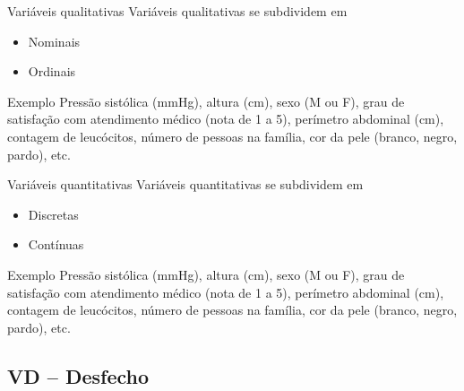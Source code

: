 \documentclass{beamer}
\begin{document}
\begin{frame}{Variáveis qualitativas}
Variáveis qualitativas se subdividem em
  \begin{itemize}
  \item<1-2> Nominais

  \item<3-4> Ordinais
  \end{itemize}


  \begin{exampleblock}{Exemplo}
    Pressão sistólica (mmHg), altura (cm), \alert{sexo (M ou
      F)}, \alert{grau de satisfação com atendimento médico
      (nota de 1 a 5)}, perímetro abdominal (cm), contagem de
    leucócitos, número de pessoas na família, \alert{cor da
      pele (branco, negro, pardo)}, etc.
  \end{exampleblock}
\end{frame}

\begin{frame}{Variáveis quantitativas}
Variáveis quantitativas se subdividem em
  \begin{itemize}
  \item<1-2> Discretas
  \item<3-4> Contínuas
  \end{itemize}
  \begin{exampleblock}{Exemplo}
    \alert{Pressão sistólica (mmHg)}, \alert{altura
      (cm)}, sexo (M ou F), grau de satisfação com atendimento médico
    (nota de 1 a 5), perímetro abdominal (cm), \alert{contagem
      de leucócitos}, \alert{número de pessoas na família},
    cor da pele (branco, negro, pardo), etc.
  \end{exampleblock}
\end{frame}

\subsection{VD -- Desfecho}
\end{document}
